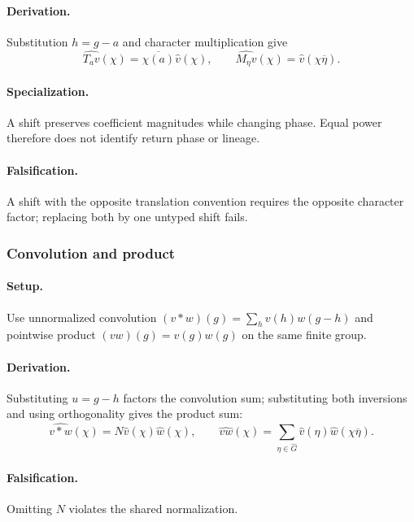 \paragraph{Derivation.}
Substitution \(h=g-a\) and character multiplication give
\begin{equation}
\widehat{T_a v}(\chi)=\overline{\chi(a)}\widehat v(\chi),
\qquad \widehat{M_\eta v}(\chi)=\widehat v(\chi\overline\eta).
\label{eq:fourier-shift-modulation}
\end{equation}
\paragraph{Specialization.} A shift preserves coefficient magnitudes while
changing phase. Equal power therefore does not identify return phase or lineage.
\paragraph{Falsification.} A shift with the opposite translation convention
requires the opposite character factor; replacing both by one untyped shift fails.


\subsubsection{Convolution and product}
\paragraph{Setup.}
Use unnormalized convolution \((v*w)(g)=\sum_h v(h)w(g-h)\) and pointwise
product \((vw)(g)=v(g)w(g)\) on the same finite group.
\paragraph{Derivation.} Substituting \(u=g-h\) factors the convolution sum;
substituting both inversions and using orthogonality gives the product sum:
\begin{equation}
\widehat{v*w}(\chi)=N\widehat v(\chi)\widehat w(\chi),\qquad
\widehat{vw}(\chi)=\sum_{\eta\in\widehat G}
\widehat v(\eta)\widehat w(\chi\overline\eta).
\label{eq:fourier-convolution-product}
\end{equation}
\paragraph{Falsification.} Omitting \(N\) violates the shared normalization.

